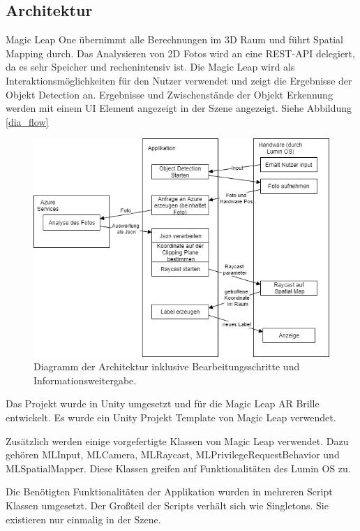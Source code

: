 \subsection{Architektur}

Magic Leap One übernimmt alle Berechnungen im 3D Raum und führt Spatial Mapping durch. Das Analysieren von 2D Fotos wird an eine REST-API delegiert, da es sehr Speicher und rechenintensiv ist. Die Magic Leap wird als Interaktionsmöglichkeiten für den Nutzer verwendet und zeigt die Ergebnisse der Objekt Detection an. Ergebnisse und Zwischenstände der Objekt Erkennung werden mit einem UI Element angezeigt in der Szene angezeigt. Siehe Abbildung \ref{dia_flow} %

\begin{figure}[H]
	\centering
	\includegraphics[width=1\textwidth]{images/dia_flow.png}
	\caption[]{Diagramm der Architektur inklusive Bearbeitungsschritte und Informationsweitergabe.}
	\label{dia:flow}
\end{figure}

Das Projekt wurde in Unity umgesetzt und für die Magic Leap AR Brille entwickelt.
Es wurde ein Unity Projekt Template von Magic Leap verwendet. 

Zusätzlich werden einige vorgefertigte Klassen von Magic Leap verwendet. Dazu gehören MLInput, MLCamera, MLRaycast, MLPrivilegeRequestBehavior und MLSpatialMapper. Diese Klassen greifen auf Funktionalitäten des Lumin OS zu.

Die Benötigten Funktionalitäten der Applikation wurden in mehreren Script Klassen umgesetzt. Der Großteil der Scripts
 verhält sich wie Singletons. Sie existieren nur einmalig in der Szene.

